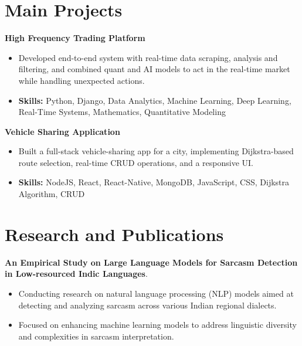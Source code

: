 \documentclass[a4paper,11pt]{article}
\begin{document}
\section{\textbf{Main Projects}}

\vspace{1mm}
  \textbf{High Frequency Trading Platform  }
\vspace{-1.5mm} %
\begin{itemize}
  \item Developed end-to-end system with real-time data scraping, analysis and filtering, and combined quant and AI models to act in the real-time market while handling unexpected actions.
\vspace{-3mm}
  \item \textbf{Skills:} Python, Django, Data Analytics, Machine Learning, Deep Learning, Real-Time Systems, Mathematics, Quantitative Modeling
\end{itemize}


\vspace{1mm}
   \textbf{Vehicle Sharing Application }
\vspace{-1.5mm} %
\begin{itemize}
  \item Built a full-stack vehicle-sharing app for a city, implementing Dijkstra-based route selection, real-time CRUD operations, and a responsive UI.
\vspace{-3mm}
  \item \textbf{Skills:} NodeJS, React, React-Native, MongoDB, JavaScript, CSS, Dijkstra Algorithm, CRUD
\end{itemize}



\section{\textbf{Research and Publications} \hfill }
\vspace{1mm}
  \textbf{An Empirical Study on Large Language Models for Sarcasm Detection in Low-resourced Indic Languages}.
\vspace{-1mm} %
\begin{itemize}
  \item Conducting research on natural language processing (NLP) models aimed at detecting and analyzing sarcasm across various Indian regional dialects.
\vspace{-3mm}
  \item Focused on enhancing machine learning models to address linguistic diversity and complexities in sarcasm interpretation.
\end{itemize}
\end{document}
